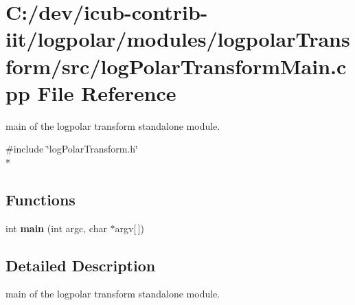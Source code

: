 \section{C\+:/dev/icub-\/contrib-\/iit/logpolar/modules/logpolar\+Transform/src/log\+Polar\+Transform\+Main.cpp File Reference}
\label{logPolarTransformMain_8cpp}


main of the logpolar transform standalone module.  


{\ttfamily \#include \char`\"{}log\+Polar\+Transform.\+h\char`\"{}}\\*
\subsection*{Functions}
\begin{DoxyCompactItemize}
\item 
int {\bfseries main} (int argc, char $\ast$argv\mbox{[}$\,$\mbox{]})\label{logPolarTransformMain_8cpp_a0ddf1224851353fc92bfbff6f499fa97}

\end{DoxyCompactItemize}


\subsection{Detailed Description}
main of the logpolar transform standalone module. 


